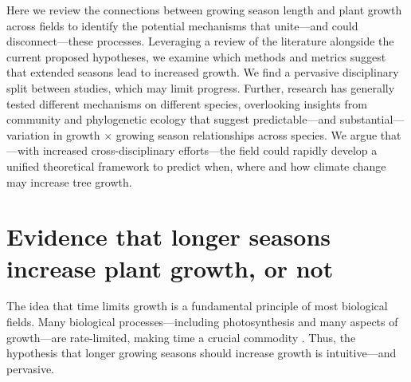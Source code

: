 \documentclass[11pt]{article}
\begin{document}
Here we review the connections between growing season length and plant growth across fields to identify the potential mechanisms that unite---and could disconnect---these processes. %
Leveraging a review of the literature alongside the current proposed hypotheses, we examine which methods and metrics suggest that extended seasons lead to increased growth. We find a pervasive disciplinary split between studies, which may limit progress. Further, research has generally tested different mechanisms on different species, overlooking insights from community and phylogenetic ecology \citep[e.g.,][]{Grime:1977sw,Ackerly:2009ly,avila2023evidence} that suggest predictable---and substantial---variation in growth $\times$ growing season relationships across species. We argue that---with increased cross-disciplinary efforts---the field could rapidly develop a unified theoretical framework to predict when, where and how climate change may increase tree growth. %

\section*{Evidence that longer seasons increase plant growth, or not}
The idea that time limits growth is a fundamental principle of most biological fields. Many biological processes---including photosynthesis and many aspects of growth---are rate-limited, making time a crucial commodity \citep{nobel1983biophysical,cosgrove2005growth,hilty2021plant}. Thus, the hypothesis that longer growing seasons should increase growth is intuitive---and pervasive. 
\end{document}
